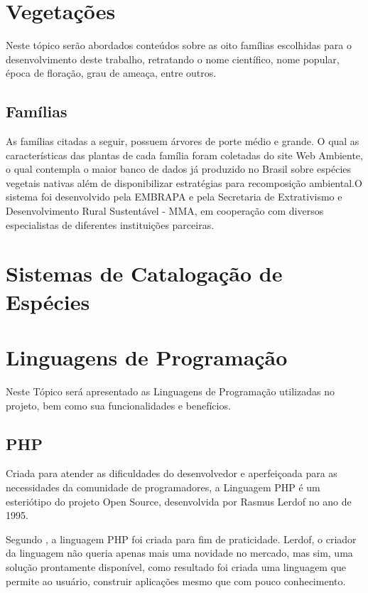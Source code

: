 \section{Vegetações}

Neste tópico serão abordados conteúdos sobre as oito famílias escolhidas para o desenvolvimento deste trabalho, retratando o nome científico, nome popular, época de floração, grau de ameaça, entre outros.

\subsection{Famílias}

As famílias citadas a seguir, possuem  árvores de porte médio e grande. O qual as características das plantas de cada família foram coletadas do site Web Ambiente, o qual contempla o maior banco de dados já produzido no Brasil sobre espécies vegetais nativas além de disponibilizar estratégias para recomposição ambiental.O sistema foi desenvolvido pela EMBRAPA e pela Secretaria de Extrativismo e Desenvolvimento Rural Sustentável - MMA, em cooperação com diversos especialistas de diferentes instituições parceiras.


\section{Sistemas de Catalogação de Espécies}

 
\section{Linguagens de Programação}	

Neste Tópico será apresentado as Linguagens de Programação utilizadas no projeto, bem como sua funcionalidades e benefícios.

\subsection{PHP}

Criada para atender as dificuldades do desenvolvedor e aperfeiçoada para as necessidades da comunidade de programadores, a Linguagem PHP é um esteriótipo do projeto Open Source, desenvolvida por Rasmus Lerdof no ano de 1995.

Segundo , a linguagem PHP foi criada para fim de praticidade. Lerdof, o criador da linguagem não queria apenas mais uma novidade no mercado, mas sim, uma solução prontamente disponível, como resultado foi criada uma linguagem que permite ao usuário, construir aplicações mesmo que com pouco conhecimento.

